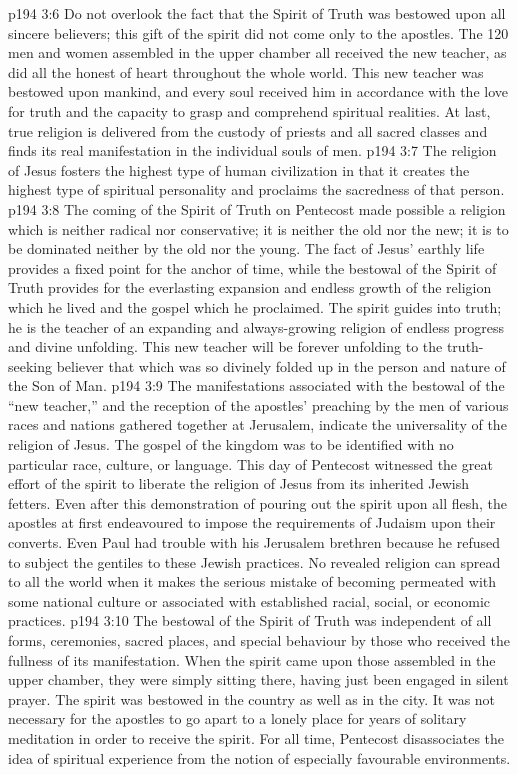 \vs p194 3:6 \pc Do not overlook the fact that the Spirit of Truth was bestowed upon all sincere believers; this gift of the spirit did not come only to the apostles. The 120 men and women assembled in the upper chamber all received the new teacher, as did all the honest of heart throughout the whole world. This new teacher was bestowed upon mankind, and every soul received him in accordance with the love for truth and the capacity to grasp and comprehend spiritual realities. At last, true religion is delivered from the custody of priests and all sacred classes and finds its real manifestation in the individual souls of men.
\vs p194 3:7 \pc The religion of Jesus fosters the highest type of human civilization in that it creates the highest type of spiritual personality and proclaims the sacredness of that person.
\vs p194 3:8 The coming of the Spirit of Truth on Pentecost made possible a religion which is neither radical nor conservative; it is neither the old nor the new; it is to be dominated neither by the old nor the young. The fact of Jesus’ earthly life provides a fixed point for the anchor of time, while the bestowal of the Spirit of Truth provides for the everlasting expansion and endless growth of the religion which he lived and the gospel which he proclaimed. The spirit guides into  truth; he is the teacher of an expanding and always\hyp{}growing religion of endless progress and divine unfolding. This new teacher will be forever unfolding to the truth\hyp{}seeking believer that which was so divinely folded up in the person and nature of the Son of Man.
\vs p194 3:9 The manifestations associated with the bestowal of the “new teacher,” and the reception of the apostles’ preaching by the men of various races and nations gathered together at Jerusalem, indicate the universality of the religion of Jesus. The gospel of the kingdom was to be identified with no particular race, culture, or language. This day of Pentecost witnessed the great effort of the spirit to liberate the religion of Jesus from its inherited Jewish fetters. Even after this demonstration of pouring out the spirit upon all flesh, the apostles at first endeavoured to impose the requirements of Judaism upon their converts. Even Paul had trouble with his Jerusalem brethren because he refused to subject the gentiles to these Jewish practices. No revealed religion can spread to all the world when it makes the serious mistake of becoming permeated with some national culture or associated with established racial, social, or economic practices.
\vs p194 3:10 The bestowal of the Spirit of Truth was independent of all forms, ceremonies, sacred places, and special behaviour by those who received the fullness of its manifestation. When the spirit came upon those assembled in the upper chamber, they were simply sitting there, having just been engaged in silent prayer. The spirit was bestowed in the country as well as in the city. It was not necessary for the apostles to go apart to a lonely place for years of solitary meditation in order to receive the spirit. For all time, Pentecost disassociates the idea of spiritual experience from the notion of especially favourable environments.
